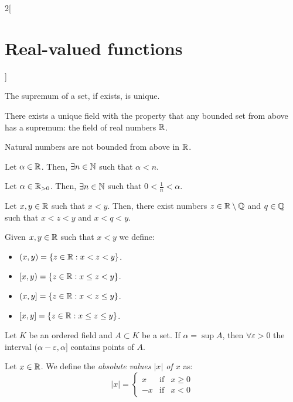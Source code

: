 \documentclass[../../../main.tex]{subfiles}
\begin{document}
\begin{multicols}{2}[\section{Real-valued functions}]
\begin{prop}
  \end{prop}
  \begin{prop}
    The supremum of a set, if exists, is unique.
  \end{prop}
  \begin{theorem}
    There exists a unique field with the property that any bounded set from above has a supremum: the field of real numbers $\mathbb{R}$.
  \end{theorem}
  \begin{prop}
    Natural numbers are not bounded from above in $\mathbb{R}$.
  \end{prop}
  \begin{corollary}
    Let $\alpha\in\mathbb{R}$. Then, $\exists n\in\mathbb{N}$ such that $\alpha<n$.
  \end{corollary}
  \begin{corollary}
    Let $\alpha\in\mathbb{R}_{>0}$. Then, $\exists n\in\mathbb{N}$ such that $0<\frac{1}{n}<\alpha$.
  \end{corollary}
  \begin{prop}
    Let $x,y\in\mathbb{R}$ such that $x<y$. Then, there exist numbers $z\in\mathbb{R}\setminus\mathbb{Q}$ and $q\in\mathbb{Q}$ such that $x<z<y$ and $x<q<y$.
  \end{prop}
  \begin{definition}
    Given $x,y\in\mathbb{R}$ such that $x<y$ we define:
    \begin{itemize}
      \item $(x,y)=\{z\in\mathbb{R}:x<z<y\}$.
      \item $[x,y)=\{z\in\mathbb{R}:x\leq z<y\}$.
      \item $(x,y]=\{z\in\mathbb{R}:x<z\leq y\}$.
      \item $[x,y]=\{z\in\mathbb{R}:x\leq z\leq y\}$.
    \end{itemize}
  \end{definition}
  \begin{lemma}
    Let $K$ be an ordered field and $A\subset K$ be a set. If $\alpha=\sup A$, then $\forall \varepsilon>0$ the interval $(\alpha-\varepsilon,\alpha]$ contains points of $A$.
  \end{lemma}
  \begin{definition}
    Let $x\in\mathbb{R}$. We define the \textit{absolute values $|x|$ of $x$} as:
    \begin{equation*}
      |x|=\left\{
      \begin{array}{ccc}
        x  & \text{if} & x\geq 0 \\
        -x & \text{if} & x<0
      \end{array}

\end{equation*}
\end{definition}
\end{multicols}
\end{document}

